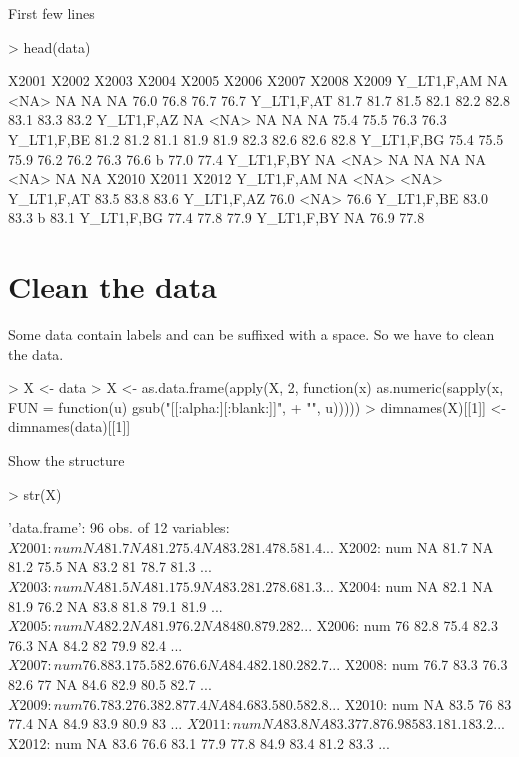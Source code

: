 \documentclass[a4paper,12pt]{article}\usepackage[]{graphicx}\usepackage[]{color}
\begin{document}
First few lines

\begin{Schunk}
\begin{Sinput}
> head(data)
\end{Sinput}
\begin{Soutput}
           X2001 X2002 X2003 X2004 X2005 X2006  X2007 X2008 X2009
Y_LT1,F,AM    NA  <NA>    NA    NA    NA  76.0  76.8   76.7  76.7
Y_LT1,F,AT  81.7 81.7   81.5  82.1  82.2  82.8  83.1   83.3  83.2
Y_LT1,F,AZ    NA  <NA>    NA    NA    NA  75.4  75.5   76.3  76.3
Y_LT1,F,BE  81.2 81.2   81.1  81.9  81.9  82.3  82.6   82.6  82.8
Y_LT1,F,BG  75.4 75.5   75.9  76.2  76.2  76.3 76.6 b  77.0  77.4
Y_LT1,F,BY    NA  <NA>    NA    NA    NA    NA   <NA>    NA    NA
           X2010  X2011 X2012
Y_LT1,F,AM    NA   <NA>  <NA>
Y_LT1,F,AT  83.5  83.8  83.6 
Y_LT1,F,AZ  76.0   <NA> 76.6 
Y_LT1,F,BE  83.0 83.3 b 83.1 
Y_LT1,F,BG  77.4  77.8  77.9 
Y_LT1,F,BY    NA  76.9  77.8 
\end{Soutput}
\end{Schunk}

\section{Clean the data}

Some data contain labels and can be suffixed with a space. So we have to clean the data.

\begin{Schunk}
\begin{Sinput}
> X <- data
> X <- as.data.frame(apply(X, 2, function(x) as.numeric(sapply(x, FUN = function(u) gsub("[[:alpha:][:blank:]]", 
+     "", u)))))
> dimnames(X)[[1]] <- dimnames(data)[[1]]
\end{Sinput}
\end{Schunk}

Show the structure
\begin{Schunk}
\begin{Sinput}
> str(X)
\end{Sinput}
\begin{Soutput}
'data.frame':	96 obs. of  12 variables:
 $ X2001: num  NA 81.7 NA 81.2 75.4 NA 83.2 81.4 78.5 81.4 ...
 $ X2002: num  NA 81.7 NA 81.2 75.5 NA 83.2 81 78.7 81.3 ...
 $ X2003: num  NA 81.5 NA 81.1 75.9 NA 83.2 81.2 78.6 81.3 ...
 $ X2004: num  NA 82.1 NA 81.9 76.2 NA 83.8 81.8 79.1 81.9 ...
 $ X2005: num  NA 82.2 NA 81.9 76.2 NA 84 80.8 79.2 82 ...
 $ X2006: num  76 82.8 75.4 82.3 76.3 NA 84.2 82 79.9 82.4 ...
 $ X2007: num  76.8 83.1 75.5 82.6 76.6 NA 84.4 82.1 80.2 82.7 ...
 $ X2008: num  76.7 83.3 76.3 82.6 77 NA 84.6 82.9 80.5 82.7 ...
 $ X2009: num  76.7 83.2 76.3 82.8 77.4 NA 84.6 83.5 80.5 82.8 ...
 $ X2010: num  NA 83.5 76 83 77.4 NA 84.9 83.9 80.9 83 ...
 $ X2011: num  NA 83.8 NA 83.3 77.8 76.9 85 83.1 81.1 83.2 ...
 $ X2012: num  NA 83.6 76.6 83.1 77.9 77.8 84.9 83.4 81.2 83.3 ...
\end{Soutput}
\end{Schunk}
\end{document}
